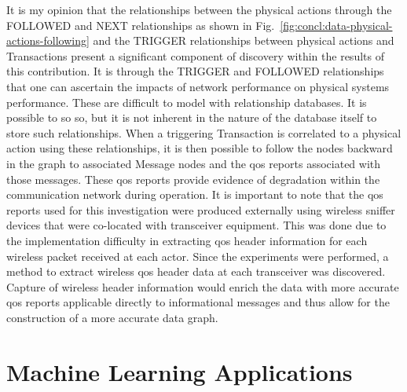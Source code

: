 It is my opinion that the relationships between the physical actions through the FOLLOWED and NEXT relationships as shown in Fig.~\ref{fig:concl:data-physical-actions-following} and the TRIGGER relationships between physical actions and Transactions present a significant component of discovery within the results of this contribution. It is through the TRIGGER and FOLLOWED relationships that one can ascertain the impacts of network performance on physical systems performance. These are difficult to model with relationship databases.  It is possible to so so, but it is not inherent in the nature of the database itself to store such relationships.  When a triggering Transaction is correlated to a physical action using these relationships, it is then possible to follow the nodes backward in the graph to associated Message nodes and the \gls{qos} reports associated with those messages. These \gls{qos} reports provide evidence of degradation within the communication network during operation.  It is important to note that the \gls{qos} reports used for this investigation were produced externally using wireless sniffer devices that were co-located with transceiver equipment.  This was done due to the implementation difficulty in extracting \gls{qos} header information for each wireless packet received at each actor.  Since the experiments were performed, a method to extract wireless \gls{qos} header data at each transceiver was discovered.  Capture of wireless header information would enrich the data with more accurate \gls{qos} reports applicable directly to informational messages and thus allow for the construction of a more accurate data graph.

\section{Machine Learning Applications}

